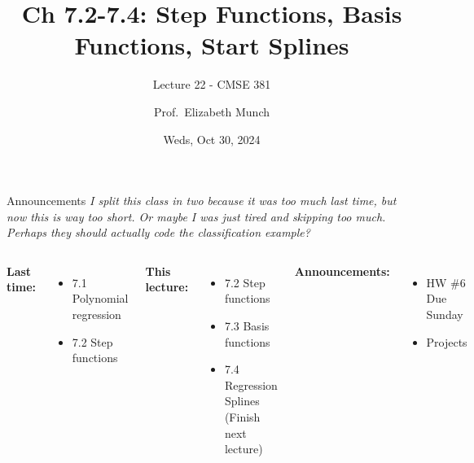 \documentclass[aspectratio=169,usenames,dvipsnames]{beamer}
\newcommand{\InstructorNotes}[1]{\textit{\color{orange}#1}}
\begin{document}
\title[]{Ch 7.2-7.4: Step Functions, Basis Functions, Start Splines }
\subtitle{Lecture 22 - CMSE 381}
\date{Weds, Oct 30, 2024}



\author[Dr.~Munch]{Prof.~Elizabeth Munch}

\begin{frame}
 \titlepage


\end{frame}
\begin{frame}[c]{Announcements}
\InstructorNotes{I split this class in two because it was too much last time, but now this is way too short. Or maybe I was just tired and skipping too much. Perhaps they should actually code the classification example? }
\begin{columns}
\centering

	\textbf{Last time:}
	\begin{itemize}
	\item 7.1 Polynomial regression 
	\item 7.2 Step functions
	\end{itemize}

	\vspace{.2in}

	\textbf{This lecture:}
	\begin{itemize}
	\item 7.2 Step functions
	\item 7.3 Basis functions
	\item 7.4 Regression Splines (Finish next lecture)
\end{itemize}


\centering

\textbf{Announcements:}
	\begin{itemize}
		\item HW \#6 Due Sunday
		\item Projects

	\end{itemize}
\end{columns}

\end{frame}
\end{document}
